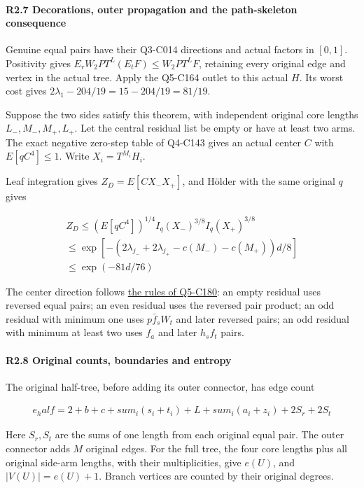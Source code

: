 \paragraph{R2.7 Decorations, outer propagation and the path-skeleton consequence}

Genuine equal pairs have their Q3-C014 directions and actual factors in \([0,\allowbreak \allowbreak  1]\). Positivity gives \(E_rW_2PT^L(E_tF)\le W_2PT^LF\), retaining every original edge and vertex in the actual tree. Apply the Q5-C164 outlet to this actual \(H\). Its worst cost gives \(2\lambda_1-204/19=15-204/19=81/19\).

Suppose the two sides satisfy this theorem, with independent original core lengths \(L_-,\allowbreak \allowbreak  M_-,\allowbreak \allowbreak  M_+,\allowbreak \allowbreak  L_+\). Let the central residual list be empty or have at least two arms. The exact negative zero-step table of Q4-C143 gives an actual center \(C\) with \(E[qC^4]\le1\). Write \(X_i=T^{M_i}H_i\).

Leaf integration gives \(Z_D=E[CX_-X_+]\), and Hölder with the same original \(q\) gives

\[
\begin{gathered}
Z_D\le (E[qC^4])^{1/4} I_q(X_-)^{3/8} I_q(X_+)^{3/8}\\
\le \exp[-(2\lambda_{j_-}+2\lambda_{j_+}-c(M_-)-c(M_+))d/8]\\
\le \exp(-81d/76) 
\end{gathered}\tag{R2.7.1}
\]

The center direction follows \hyperref[part:C180:dirs]{the rules of Q5-C180}: an empty residual uses reversed equal pairs; an even residual uses the reversed pair product; an odd residual with minimum one uses \(p\bar f_sW_t\) and later reversed pairs; an odd residual with minimum at least two uses \(f_a\) and later \(h_sf_t\) pairs.

\paragraph{R2.8 Original counts, boundaries and entropy}\label{part:R2.8}

The original half-tree, before adding its outer connector, has edge count

\[
\begin{gathered}
e_half=2+b+c+sum_i(s_i+t_i)+L+sum_i(a_i+z_i)+2S_r+2S_t
\end{gathered}
\]

Here \(S_r,\allowbreak \allowbreak  S_t\) are the sums of one length from each original equal pair. The outer connector adds \(M\) original edges. For the full tree, the four core lengths plus all original side-arm lengths, with their multiplicities, give \(e(U)\), and \(|V(U)|=e(U)+1\). Branch vertices are counted by their original degrees.

